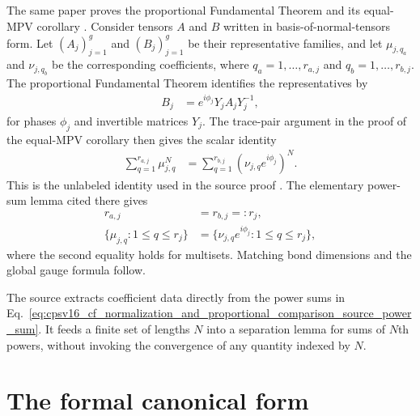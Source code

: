 \documentclass{article}
\begin{document}
The same paper proves the proportional Fundamental Theorem and its equal-MPV
corollary \cite[Section~]{Cirac2016MPDO_arXiv}. Consider
tensors $A$ and $B$ written in basis-of-normal-tensors form. Let $(A_j)_{j=1}^g$
and $(B_j)_{j=1}^g$ be their representative families, and let $\mu_{j,q_a}$
and $\nu_{j,q_b}$ be the corresponding coefficients, where
$q_a=1,\ldots,r_{a,j}$ and $q_b=1,\ldots,r_{b,j}$. The proportional Fundamental
Theorem identifies the representatives by
\begin{align}
    B_j
        &= e^{i\phi_j}Y_j A_j Y_j^{-1},
    \label{eq:cpsv16_cf_normalization_and_proportional_comparison_representative_gauge}
\end{align}
for phases $\phi_j$ and invertible matrices $Y_j$. The trace-pair argument in
the proof of the equal-MPV corollary then gives the scalar identity
\begin{align}
    \sum_{q=1}^{r_{a,j}}\mu_{j,q}^N
        &= \sum_{q=1}^{r_{b,j}}
            (\nu_{j,q}e^{i\phi_j})^N.
    \label{eq:cpsv16_cf_normalization_and_proportional_comparison_source_power_sum}
\end{align}
This is the unlabeled identity used in the source proof
\cite[Section~]{Cirac2016MPDO_arXiv}. The elementary power-sum
lemma cited there gives
\begin{align}
    r_{a,j}
        &= r_{b,j}
        =: r_j,
    \label{eq:cpsv16_cf_normalization_and_proportional_comparison_equal_multiplicities}\\
    \{\mu_{j,q}:1\leq q\leq r_j\}
        &= \{\nu_{j,q}e^{i\phi_j}:1\leq q\leq r_j\},
    \label{eq:cpsv16_cf_normalization_and_proportional_comparison_weight_multiset}
\end{align}
where the second equality holds for multisets. Matching bond dimensions and
the global gauge formula follow.

The source extracts coefficient data directly from the power sums in
Eq.~\ref{eq:cpsv16_cf_normalization_and_proportional_comparison_source_power_sum}.
It feeds a finite set of lengths $N$ into a separation lemma for sums of $N$th
powers, without invoking the convergence of any quantity indexed by $N$.

\section{The formal canonical form}
\end{document}
